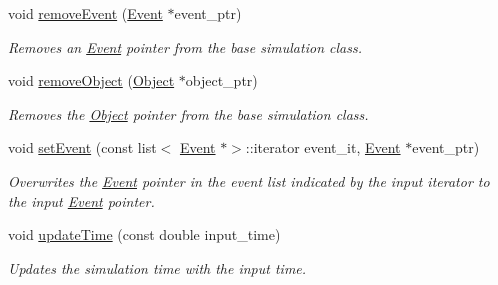 \begin{DoxyCompactItemize}
void \hyperlink{class_simulation_a3a4808231d4760f0ab30ea39b6a67e8c}{remove\+Event} (\hyperlink{class_event}{Event} $\ast$event\+\_\+ptr)
\begin{DoxyCompactList}\small\item\em Removes an \hyperlink{class_event}{Event} pointer from the base simulation class. \end{DoxyCompactList}\item 
void \hyperlink{class_simulation_a39da17feb9b487c05c9a834def44972f}{remove\+Object} (\hyperlink{class_object}{Object} $\ast$object\+\_\+ptr)
\begin{DoxyCompactList}\small\item\em Removes the \hyperlink{class_object}{Object} pointer from the base simulation class. \end{DoxyCompactList}\item 
void \hyperlink{class_simulation_a122928940c1301d71f19700b574f9e37}{set\+Event} (const list$<$ \hyperlink{class_event}{Event} $\ast$$>$\+::iterator event\+\_\+it, \hyperlink{class_event}{Event} $\ast$event\+\_\+ptr)
\begin{DoxyCompactList}\small\item\em Overwrites the \hyperlink{class_event}{Event} pointer in the event list indicated by the input iterator to the input \hyperlink{class_event}{Event} pointer. \end{DoxyCompactList}\item 
void \hyperlink{class_simulation_a1affa7d0725c3d10663095619dcb9208}{update\+Time} (const double input\+\_\+time)
\begin{DoxyCompactList}\small\item\em Updates the simulation time with the input time. \end{DoxyCompactList}\end{DoxyCompactItemize}
